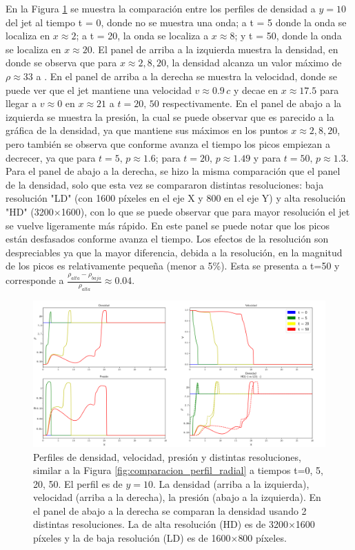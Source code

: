 \documentclass[12pt,a4paper]{book}
\begin{document}
En la Figura \ref{fig:Decaimiento_constante_densidad_jet} se muestra la comparación entre los perfiles de 
densidad a $y = 10$
del jet al tiempo t = 0, donde no se muestra una onda; a t = 5 donde la onda se localiza en $x \approx 2$; 
a t = 20, la onda se localiza a $x \approx 8$; y  t = 50, donde la onda se localiza en $x \approx 20$. 
El panel de arriba a la izquierda muestra la densidad, en donde
se observa que para $x \approx 2, 8, 20$, la densidad alcanza un valor máximo de 
$\rho  \approx 33$ a .
En el panel de arriba a la derecha se muestra la velocidad, donde se puede ver que el jet mantiene una velocidad 
$v \approx 0.9 \, c$ y decae en $x \approx 17.5$ para llegar a $v \approx 0 $ en  $x \approx 21$ a $t = 20, \, 50$ respectivamente. 
En el panel de abajo a la
izquierda se muestra la presión, la cual se puede observar que es parecido a la gráfica de la 
densidad, ya que mantiene sus máximos en los puntos $x \approx 2, 8, 20$, pero también se observa que conforme avanza el
tiempo los picos empiezan a decrecer, ya que para $t = 5, \, p \approx 1.6 $; 
para $t = 20, \, p \approx 1.49$ y para 
$t = 50, \, p  \approx 1.3$. Para el panel de abajo a la derecha, se hizo la misma comparación que el panel 
de la densidad, solo que esta vez se compararon  distintas resoluciones: baja resolución "LD" (con 1600 píxeles en el eje X y 800 en el eje Y) 
y alta resolución "HD" (3200$\times$1600), con lo que se puede observar que 
para mayor resolución el jet se vuelve ligeramente más rápido. En este panel se puede notar que
los picos están desfasados conforme avanza el tiempo. Los efectos de la resolución son despreciables ya 
que la mayor diferencia, debida a la resolución, en la magnitud de los picos es relativamente pequeña (menor a 5\%). Esta se presenta a t=50 y corresponde a $\frac{\rho_{alta} - \rho_{baja}}{\rho_{alta}} \approx 0.04$.


\begin{figure}
  \centering
  \includegraphics[width = 1.0\textwidth]{./Figuras/capitulo_4/perfiles/perfiles_constantes.png}
  \caption{Perfiles de densidad, velocidad, presión y distintas resoluciones, similar a la Figura 
  \ref{fig:comparacion_perfil_radial} a tiempos t=0, 5, 20, 50.
  El perfil es de $y = 10$.
  La densidad (arriba a la izquierda), velocidad (arriba a la derecha), la presión (abajo a la izquierda). 
  En el panel de abajo a la derecha se comparan la densidad usando 2 distintas resoluciones. La de alta resolución 
  (HD)
  es de 3200$\times$1600 píxeles y la de baja resolución (LD) es de 1600$\times$800 píxeles.}\label{fig:Decaimiento_constante_densidad_jet}
\end{figure}
\end{document}
